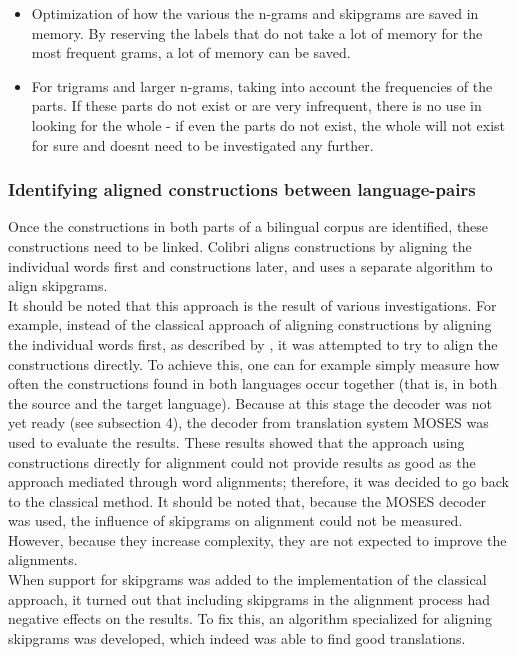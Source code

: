 \documentclass[12pt]{article}
\begin{document}
\begin{itemize}
\item Optimization of how the various the n-grams and skipgrams are saved in memory. By reserving the labels that do not take a lot of memory for the most frequent grams, a lot of memory can be saved.
\item For trigrams and larger n-grams, taking into account the frequencies of the parts. If these parts do not exist or are very infrequent, there is no use in looking for the whole - if even the parts do not exist, the whole will not exist for sure and doesnt need to be investigated any further.
\end{itemize}

\subsubsection{Identifying aligned constructions between language-pairs}
Once the constructions in both parts of a bilingual corpus are identified, these constructions need to be linked. Colibri aligns constructions by aligning the individual words first and constructions later, and uses a separate algorithm to align skipgrams.\\\indent
It should be noted that this approach is the result of various investigations. For example, instead of the classical approach of aligning constructions by aligning the individual words first, as described by \citep{koehn03}, it was attempted to try to align the constructions directly. To achieve this, one can for example simply measure how often the constructions found in both languages occur together (that is, in both the source and the target language). Because at this stage the decoder was not yet ready (see subsection 4), the decoder from translation system MOSES \citep{koehnea07} was used to evaluate the results. These results showed that the approach using constructions directly for alignment could not provide results as good as the approach mediated through word alignments; therefore, it was decided to go back to the classical method. It should be noted that, because the MOSES decoder was used, the influence of skipgrams on alignment could not be measured. However, because they increase complexity, they are not expected to improve the alignments.\\\indent
When support for skipgrams was added to the implementation of the classical approach, it turned out that including skipgrams in the alignment process had negative effects on the results. To fix this, an algorithm specialized for aligning skipgrams was developed, which indeed was able to find good translations. 
\end{document}
